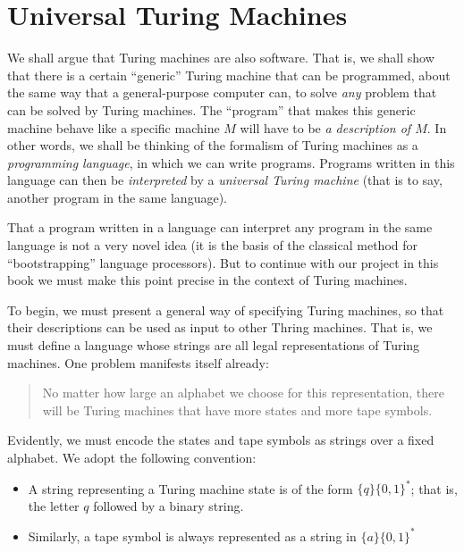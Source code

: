\section{Universal Turing Machines}
\label{sec:universal-turing-machines}

We shall argue that Turing machines are also software. That is, we shall show that there is a certain ``generic'' Turing machine that can be programmed, about the same way that a general-purpose computer can, to solve \textit{any} problem that can be solved by Turing machines. The ``program'' that makes this generic machine behave like a specific machine $M$ will have to be \textit{a description of $M$}. In other words, we shall be thinking of the formalism of Turing machines as a \textit{programming language}, in which we can write programs. Programs written in this language can then be \textit{interpreted} by a \textit{universal Turing machine} (that is to say, another program in the same language). 

That a program written in a language can interpret any program in the same language is not a very novel idea (it is the basis of the classical method for ``bootstrapping'' language processors). But to continue with our project in this book we must make this point precise in the context of Turing machines.

To begin, we must present a general way of specifying Turing machines, so that their descriptions can be used as input to other Thring machines. That is, we must define a language whose strings are all legal representations of Turing machines. One problem manifests itself already:
\begin{quote}
  No matter how large an alphabet we choose for this representation, there will be Turing machines that have more states and more tape symbols.
\end{quote}
Evidently, we must encode the states and tape symbols as strings over a fixed alphabet. We adopt the following convention:
\begin{itemize}
  \item A string representing a Turing machine state is of the form $\{ q \}\{ 0, 1 \}^*$; that is, the letter $q$ followed by a binary string.
  \item Similarly, a tape symbol is always represented as a string in $\{ a \}\{ 0, 1 \}^*$
\end{itemize}


